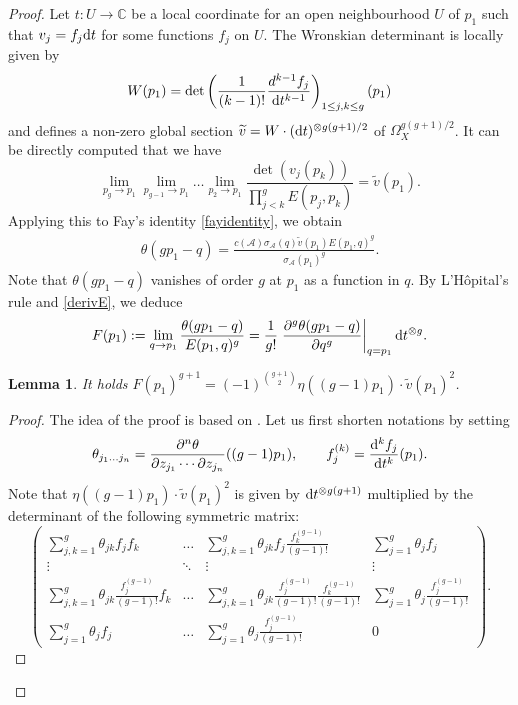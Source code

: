 \documentclass[pdftex]{sigma}
\numberwithin{equation}{section}
\newtheorem{Lemma}[Theorem]{Lemma}
\begin{document}
\begin{proof}
	Let $t\colon U\to \mathbb{C}$ be a local coordinate for an open neighbourhood $U$ of $p_1$ such that $v_j=f_{j}{\rm d}t$ for some functions $f_j$ on $U$.
	The Wronskian determinant is locally given by
	\[W(p_1)=\det\left(\frac{1}{(k-1)!}\frac{d^{k-1}f_j}{{\rm d}t^{k-1}}\right)_{1\le j,k\le g}(p_1)\]
	and defines a non-zero global section $\widetilde{v}=W\cdot({\rm d}t)^{\otimes g(g+1)/2}$ of $\Omega_X^{g(g+1)/2}$.
	It can be directly computed that we have
	\[\lim_{p_g\to p_1}\lim_{p_{g-1}\to p_1}\dots\lim_{p_2\to p_1}\frac{\det(v_j(p_k))}{\prod_{j<k}^g E(p_j,p_k)}=\widetilde{v}(p_1).\]
	Applying this to Fay's identity \eqref{fayidentity}, we obtain
	\begin{align}\label{thetawronsk}
		\theta(gp_1-q)=\frac{c(\mathcal{A})\sigma_{\mathcal{A}}(q) \widetilde{v}(p_1)E(p_1,q)^g}{\sigma_{\mathcal{A}}(p_1)^{g}}.
	\end{align}
	Note that $\theta(gp_1-q)$ vanishes of order $g$ at $p_1$ as a function in $q$. By L'H\^opital's rule and \eqref{derivE}, we deduce
	\[F(p_1):=\lim_{q\to p_1} \frac{\theta(gp_1-q)}{E(p_1,q)^g}=\frac{1}{g!}\left.\frac{\partial^g\theta(gp_1-q)}{\partial q^g}\right|_{q=p_1}{\rm d}t^{\otimes g}.\]
	\begin{Lemma}\label{lemma}
		It holds $F(p_1)^{g+1}=(-1)^{\binom{g+1}{2}}\eta((g-1)p_1)\cdot \widetilde{v}(p_1)^{2}$.
	\end{Lemma}
	\begin{proof}
		The idea of the proof is based on \cite[Section 5]{dJo10}. Let us first shorten notations by setting
		\[\theta_{j_1\dots j_n}=\frac{\partial^n\theta}{\partial z_{j_1}\cdots \partial z_{j_n}} ((g-1)p_1),\qquad f_j^{(k)}=\frac{{\rm d}^{k}f_j}{{\rm d}t^k}(p_1).\]
		Note that $\eta((g-1)p_1)\cdot \widetilde{v}(p_1)^{2}$ is given by ${\rm d}t^{\otimes g(g+1)}$ multiplied by the determinant of the following symmetric matrix:
		\[\begin{pmatrix}\sum_{j,k=1}^g\theta_{jk}f_j f_k & \dots & \sum_{j,k=1}^g\theta_{jk}f_j \frac{f_k^{(g-1)}}{(g-1)!} & \sum_{j=1}^g \theta_j f_j\\
			\vdots&\ddots&\vdots&\vdots\\
			\sum_{j,k=1}^g\theta_{jk}\frac{f_j^{(g-1)}}{(g-1)!} f_k & \dots & \sum_{j,k=1}^g\theta_{jk}\frac{f_j^{(g-1)}}{(g-1)!} \frac{f_k^{(g-1)}}{(g-1)!} & \sum_{j=1}^g \theta_j \frac{f_j^{(g-1)}}{(g-1)!}\\
			\sum_{j=1}^g\theta_{j} f_j & \dots & \sum_{j=1}^g\theta_{j}\frac{f_j^{(g-1)}}{(g-1)!} & 0\end{pmatrix}.\]
		

\end{proof}
\end{proof}
\end{document}
